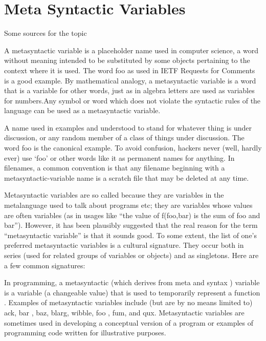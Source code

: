 \documentclass[proposal.tex]{subfiles}
\begin{document}
\section{Meta Syntactic Variables}\label{sect:metasyntacticvariables}

Some sources for the topic 


\cite{website:metasyntacticvariableswiki}
A metasyntactic variable is a placeholder name used in computer science, a word without meaning intended to be substituted by some objects pertaining to the context where it is used. The word foo as used in IETF Requests for Comments is a good example.
By mathematical analogy, a metasyntactic variable is a word that is a variable for other words, just as in algebra letters are used as variables for numbers.Any symbol or word which does not violate the syntactic rules of the language can be used as a metasyntactic variable.




\cite{webiste:metasyntacticvariablescatb}
A name used in examples and understood to stand for whatever thing is under discussion, or any random member of a class of things under discussion. The word foo is the canonical example. To avoid confusion, hackers never (well, hardly ever) use ‘foo’ or other words like it as permanent names for anything. In filenames, a common convention is that any filename beginning with a metasyntactic-variable name is a scratch file that may be deleted at any time.

Metasyntactic variables are so called because they are variables in the metalanguage used to talk about programs etc; they are variables whose values are often variables (as in usages like “the value of f(foo,bar) is the sum of foo and bar”). However, it has been plausibly suggested that the real reason for the term “metasyntactic variable” is that it sounds good. To some extent, the list of one's preferred metasyntactic variables is a cultural signature. They occur both in series (used for related groups of variables or objects) and as singletons. Here are a few common signatures:


\cite{webiste:metasyntacticvariableswhatistectarget}
In programming, a metasyntactic (which derives from meta and syntax ) variable is a variable (a changeable value) that is used to temporarily represent a function . Examples of metasyntactic variables include (but are by no means limited to) ack, bar , baz, blarg, wibble, foo , fum, and qux. Metasyntactic variables are sometimes used in developing a conceptual version of a program or examples of programming code written for illustrative purposes.
\end{document}
